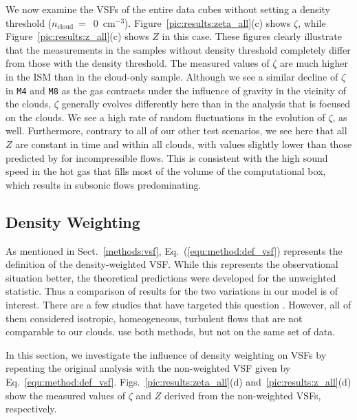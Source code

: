 We now examine the VSFs of the entire data cubes without setting a density threshold ($n_\mathrm{cloud}~=$~0~cm$^{-3}$).  Figure~\ref{pic:results:zeta_all}(c) shows $\zeta$, while Figure~\ref{pic:results:z_all}(c) shows $Z$ in this case.
These figures clearly illustrate that the measurements in the samples without density threshold completely differ from those with the density threshold.
The measured values of $\zeta$ are much higher in the ISM than in the cloud-only sample.
Although we see a similar decline of $\zeta$ in \texttt{M4} and \texttt{M8} as the gas contracts under the influence of gravity in the vicinity of the clouds, $\zeta$ generally evolves differently here than in the analysis that is focused on the clouds.
We see a high rate of random fluctuations in the evolution of $\zeta$, as well.
Furthermore, contrary to all of our other test scenarios, we see here that all $Z$ are constant in time and within all clouds, with values slightly lower than those predicted by \citet{She1994} for incompressible flows.  
This is consistent with the high sound speed in the hot gas that fills most of the volume of the computational box, which results in subsonic flows predominating.


\subsection{Density Weighting}\label{results:densweight}

As mentioned in Sect.~\ref{methods:vsf}, Eq.~(\ref{equ:method:def_vsf}) represents the definition of the density-weighted VSF.
While this represents the observational situation better, the theoretical predictions were developed for the unweighted statistic.  Thus a comparison of results for the two variations in our model is of interest.
There are a few studies that have targeted this question 
\citep[e.g.,][]{Benzi1993,Schmidt2008, Benzi2010,Gotoh2002}.  
However, all of them considered isotropic, homeogeneous, turbulent flows that are not comparable to our clouds.
\citet{Padoan2016a} use both methods, but not on the same set of data. 

In this section, we investigate the influence of density weighting on VSFs by repeating the original analysis with the non-weighted VSF given by Eq.~\ref{equ:method:def_vsf}.
Figs.~\ref{pic:results:zeta_all}(d) and~\ref{pic:results:z_all}(d) show the measured values of $\zeta$ and $Z$ derived from the non-weighted VSFs, respectively.

